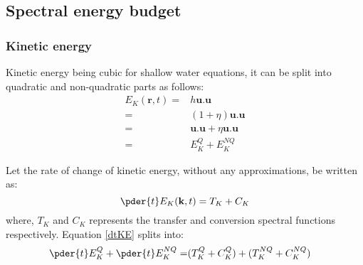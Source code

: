 \subsection{Spectral energy budget}
\subsubsection{Kinetic energy}
Kinetic energy being cubic for shallow water equations, it can be split into
quadratic and non-quadratic parts as follows:
\begin{align*}
    E_K(\mathbf{r},t)
    = & h\mathbf{u}.\mathbf{u}                            \\
    = & (1+\eta)\mathbf{u}.\mathbf{u}                     \\
    = & \mathbf{u}.\mathbf{u} + \eta\mathbf{u}.\mathbf{u} \\
    = & E_K^Q + E_K^{NQ}
\end{align*}

Let the rate of change of kinetic energy, without any approximations, be
written as:
\begin{equation}\label{dtKE}
    \pder{t}E_K(\mathbf{k},t) = T_K + C_K
\end{equation}
where, $T_K$ and $C_K$ represents the transfer and conversion spectral
functions respectively. Equation
\eqref{dtKE} splits into:
\begin{align*}
    \pder{t}E_K^Q + \pder{t}E_K^{NQ}
    = & (T_K^{Q} + C_K^{Q}) + (T_K^{NQ} + C_K^{NQ})
\end{align*}
